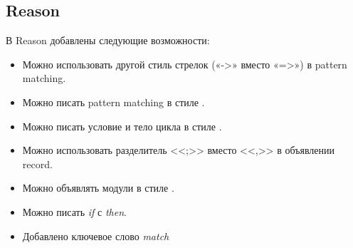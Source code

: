 \subsection{Reason}
В Reason добавлены следующие возможности:
\begin{itemize}

\item Можно использовать другой стиль стрелок («->» вместо «=>») в pattern matching.%

\item Можно писать pattern matching в стиле \OCaml{}.%

\item Можно писать условие и тело цикла в стиле \OCaml{}.

\item Можно использовать разделитель <<;>> вместо <<,>> в объявлении record.

\item Можно объявлять модули в стиле \OCaml{}.

\item Можно писать {\it if} с {\it then}.

\item Добавлено ключевое слово {\it match}%

\end{itemize}

